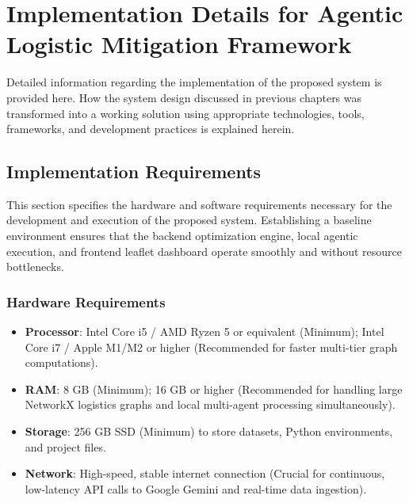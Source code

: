 \chapter[Implementation Details for Agentic Logistic Mitigation Framework]{Implementation Details for Agentic Logistic Mitigation Framework}
\sloppy

Detailed information regarding the implementation of the proposed system is provided here. How the system design discussed in previous chapters was transformed into a working solution using appropriate technologies, tools, frameworks, and development practices is explained herein.


\section[Implementation Requirements]{Implementation Requirements}
This section specifies the hardware and software requirements necessary for the development and execution of the proposed system. Establishing a baseline environment ensures that the backend optimization engine, local agentic execution, and frontend leaflet dashboard operate smoothly and without resource bottlenecks.

\subsection[Hardware Requirements]{Hardware Requirements}
\begin{itemize}
\item \textbf{Processor}: Intel Core i5 / AMD Ryzen 5 or equivalent (Minimum); Intel Core i7 / Apple M1/M2 or higher (Recommended for faster multi-tier graph computations).
\item \textbf{RAM}: 8 GB (Minimum); 16 GB or higher (Recommended for handling large NetworkX logistics graphs and local multi-agent processing simultaneously).
\item \textbf{Storage}: 256 GB SSD (Minimum) to store datasets, Python environments, and project files.
\item \textbf{Network}: High-speed, stable internet connection (Crucial for continuous, low-latency API calls to Google Gemini and real-time data ingestion).
\end{itemize}

